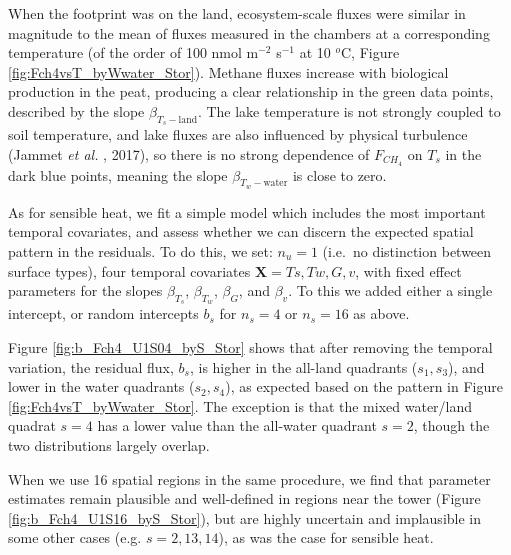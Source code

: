 When the footprint was on the land, ecosystem-scale fluxes were similar
in magnitude to the mean of fluxes measured in the chambers at a
corresponding temperature (of the order of 100 nmol m\(^{-2}\)
s\(^{-1}\) at 10 \(^o\)C, Figure \ref{fig:Fch4vsT_byWwater_Stor}).
Methane fluxes increase with biological production in the peat,
producing a clear relationship in the green data points, described by
the slope \(\beta_{T_{s}-\mathrm{land}}\). The lake temperature is not
strongly coupled to soil temperature, and lake fluxes are also
influenced by physical turbulence (Jammet \emph{et al.} , 2017), so there
is no strong dependence of \(F_{CH_4}\) on \(T_s\) in the dark blue
points, meaning the slope \(\beta_{T_{w}-\mathrm{water}}\) is close to
zero.

As for sensible heat, we fit a simple model which includes the most
important temporal covariates, and assess whether we can discern the
expected spatial pattern in the residuals. To do this, we set:
\(n_u = 1\) (i.e.~no distinction between surface types), four temporal
covariates \(\mathbf{X} = {Ts, Tw, G, v}\), with fixed effect parameters
for the slopes \(\beta_{T_s}\), \(\beta_{T_w}\), \(\beta_{G}\), and
\(\beta_{v}\). To this we added either a single intercept, or random
intercepts \(b_s\) for \(n_s = 4\) or \(n_s = 16\) as above.

Figure \ref{fig:b_Fch4_U1S04_byS_Stor} shows that after removing the
temporal variation, the residual flux, \(b_{s}\), is higher in the
all-land quadrants (\(s_{1}, s_{3}\)), and lower in the water quadrants
(\(s_{2}, s_{4}\)), as expected based on the pattern in Figure
\ref{fig:Fch4vsT_byWwater_Stor}. The exception is that the mixed
water/land quadrat \(s=4\) has a lower value than the all-water quadrant
\(s=2\), though the two distributions largely overlap.

When we use 16 spatial regions in the same procedure, we find that
parameter estimates remain plausible and well-defined in regions near
the tower (Figure \ref{fig:b_Fch4_U1S16_byS_Stor}), but are highly
uncertain and implausible in some other cases (e.g. \(s=2,13,14\)), as
was the case for sensible heat.


